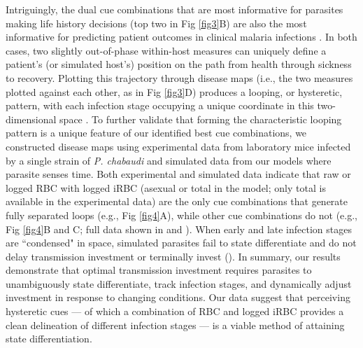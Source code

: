 \documentclass[10pt,letterpaper]{article}
\begin{document}
Intriguingly, the dual cue combinations that are most informative for parasites making life history decisions (top two in Fig \ref{fig3}B) are also the most informative for predicting patient outcomes in clinical malaria infections \cite{torres_tracking_2016}. In both cases, two slightly out-of-phase within-host measures can uniquely define a patient’s (or simulated host's) position on the path from health through sickness to recovery. Plotting this trajectory through disease maps (i.e., the two measures plotted against each other, as in Fig \ref{fig3}D) produces a looping, or hysteretic, pattern, with each infection stage occupying a unique coordinate in this two-dimensional space \cite{torres_tracking_2016}. To further validate that forming the characteristic looping pattern is a unique feature of our identified best cue combinations, we constructed disease maps using experimental data from laboratory mice infected by a single strain of \emph{P. chabaudi} \cite{huijben_data_2011,huijben_data_2013,huijben_data_2014,huijben_data_2018, pollitt_competition_2011, reece_sex_2008} and simulated data from our models where parasite senses time. Both experimental and simulated data indicate that raw or logged RBC with logged iRBC (asexual or total in the model; only total is available in the experimental data) are the only cue combinations that generate fully separated loops (e.g., Fig \ref{fig4}A), while other cue combinations do not (e.g., Fig \ref{fig4}B and C; full data shown in  and ). When early and late infection stages are ``condensed" in space, simulated parasites fail to state differentiate and do not delay transmission investment or terminally invest (). In summary, our results demonstrate that optimal transmission investment requires parasites to unambiguously state differentiate, track infection stages, and dynamically adjust investment in response to changing conditions. Our data suggest that perceiving hysteretic cues --- of which a combination of RBC and logged iRBC provides a clean delineation of different infection stages --- is a viable method of attaining state differentiation.
\end{document}
